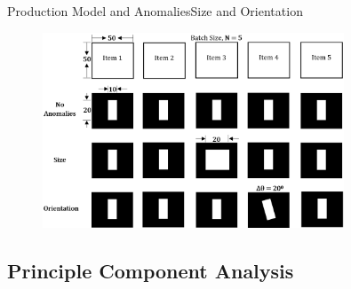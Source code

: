 \documentclass{beamer}
\begin{document}

\begin{frame}{Production Model and Anomalies}{Size and Orientation}
  \begin{figure}
    \includegraphics[width=0.8\textwidth]{anomalies_model}
  \end{figure}
\end{frame}

\subsection{Principle Component Analysis}
\end{document}

